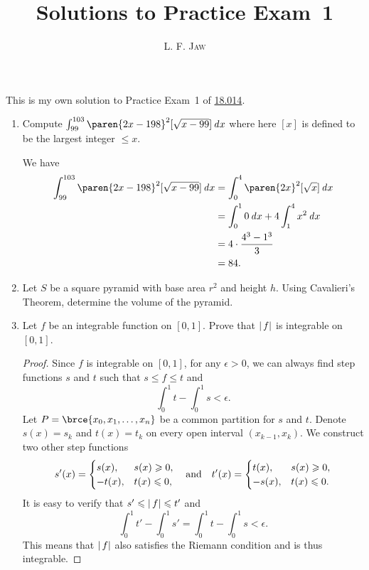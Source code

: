 \documentclass[a4paper]{article}
\title{Solutions to Practice Exam~1}
\author{L. F. \textsc{Jaw}}
\begin{document}
\maketitle

This is my own solution to Practice Exam~1 of
\href{https://ocw.mit.edu/courses/mathematics/18-014-calculus-with-theory-fall-2010/exams/}{18.014}.

\begin{enumerate}
\item Compute \(\int_{99}^{103} \paren{2x-198}^2 [\sqrt{x-99}] \dx\)
  where here \([x]\) is defined to be the largest integer \(\le x\).

  We have
  \begin{align*}
    \int_{99}^{103} \paren{2x-198}^2 [\sqrt{x-99}] \dx
      &= \int_0^4 \paren{2x}^2 [\sqrt x] \dx \\
      &= \int_0^1 0 \dx + 4 \int_1^4 x^2 \dx \\
      &= 4 \cdot \frac{4^3 - 1^3}{3} \\
      &= 84.
  \end{align*}

\item Let \(S\) be a square pyramid with base area \(r^2\) and height
  \(h\).  Using Cavalieri's Theorem, determine the volume of the
  pyramid.

\item Let \(f\) be an integrable function on \([0, 1]\).  Prove that
  \(\lvert\,f\rvert\) is integrable on \([0, 1]\).

  \begin{proof}
    Since \(f\) is integrable on \([0, 1]\), for any \(\epsilon > 0\), we
    can always find step functions \(s\) and \(t\) such that
    \(s \le f \le t\) and
    \[
      \int_0^1 t - \int_0^1 s < \epsilon.
    \]
    Let \(P = \brce{x_0, x_1, \dotsc, x_n}\) be a common partition for \(s\)
    and \(t\).  Denote \(s(x) = s_k\) and \(t(x) = t_k\) on every open
    interval \((x_{k-1}, x_k)\).  We construct two other step functions
    \begin{gather*}
      s'(x) =
      \begin{cases}
        s(x), & s(x) \ge 0, \\
        -t(x), & t(x) \le 0,
      \end{cases}
      \qand
      t'(x) =
      \begin{cases}
        t(x), & s(x) \ge 0, \\
        -s(x), & t(x) \le 0.
      \end{cases}
    \end{gather*}
    It is easy to verify that \(s' \le \abs{\,f} \le t'\) and
    \[
      \int_0^1 t' - \int_0^1 s' = \int_0^1 t - \int_0^1 s < \epsilon.
    \]
    This means that \(\lvert\,f\rvert\) also satisfies the Riemann condition and
    is thus integrable.
  \end{proof}


\end{enumerate}
\end{document}
